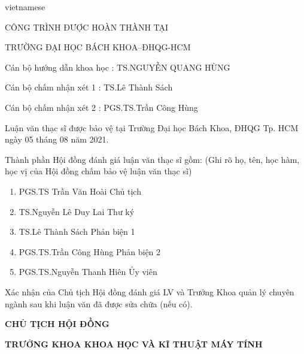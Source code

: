 \begin{titlepage}
\begin{otherlanguage*}{vietnamese}
\begin{center}
CÔNG TRÌNH ĐƯỢC HOÀN THÀNH TẠI

TRƯỜNG ĐẠI HỌC BÁCH KHOA–ĐHQG-HCM
\end{center}

\vspace*{3\bigskipamount}

Cán bộ hướng dẫn khoa học : TS.NGUYỄN QUANG HÙNG

\vspace*{1\bigskipamount}

Cán bộ chấm nhận xét 1 : TS.Lê Thành Sách

\vspace*{1\bigskipamount}

Cán bộ chấm nhận xét 2 : PGS.TS.Trần Công Hùng

\vspace*{1\bigskipamount}

Luận văn thạc sĩ được bảo vệ tại Trường Đại học Bách Khoa, ĐHQG Tp. HCM ngày 05 tháng 08 năm 2021. 

\vspace*{1\bigskipamount}

Thành phần Hội đồng đánh giá luận văn thạc sĩ gồm:
(Ghi  rõ họ, tên, học hàm, học vị của Hội đồng chấm bảo vệ luận văn thạc sĩ)
\begin{enumerate}
\item PGS.TS Trần Văn Hoài \tabto{10cm} Chủ tịch
\item TS.Nguyễn Lê Duy Lai \tabto{10cm} Thư ký
\item TS.Lê Thành Sách \tabto{10cm} Phản biện 1
\item PGS.TS.Trần Công Hùng \tabto{10cm} Phản biện 2
\item PGS.TS.Nguyễn Thanh Hiên \tabto{10cm} Ủy viên
\end{enumerate}

\vspace*{2\bigskipamount}

Xác nhận của Chủ tịch Hội đồng đánh giá LV và Trưởng Khoa quản lý chuyên ngành sau khi luận văn đã được sửa chữa (nếu có).

\vspace*{2\bigskipamount}

\begin{minipage}[t]{0.4\textwidth}
    \begin{center}
        \textbf{CHỦ TỊCH HỘI ĐỒNG}
    \end{center}
\end{minipage}
\noindent
\begin{minipage}[t]{0.55\textwidth}
    \begin{center}
        \textbf{TRƯỞNG KHOA KHOA HỌC VÀ KĨ THUẬT MÁY TÍNH}
    \end{center}
\end{minipage}

\end{otherlanguage*}
\end{titlepage}

